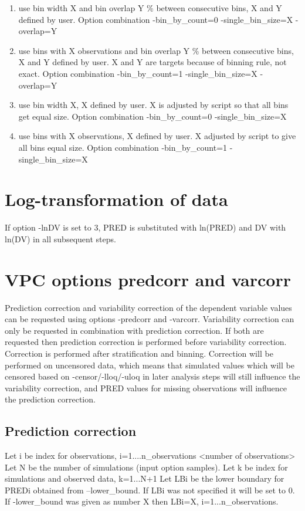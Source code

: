 \begin{enumerate}
	\item use bin width X and bin overlap Y \% between consecutive bins, X and Y defined by user. Option combination -bin\_by\_count=0 -single\_bin\_size=X -overlap=Y
	\item use bins with X observations and bin overlap Y \% between consecutive bins, X and Y defined by user.  X and Y are targets because of binning rule, not exact. Option combination -bin\_by\_count=1 -single\_bin\_size=X -overlap=Y
	\item use bin width X, X defined by user. X is adjusted by script so that all bins get equal size. Option combination -bin\_by\_count=0 -single\_bin\_size=X
	\item use bins with X observations, X defined by user.  X adjusted by script to give all bins equal size. Option combination -bin\_by\_count=1 -single\_bin\_size=X
\end{enumerate}

\section{Log-transformation of data}
If option -lnDV is set to 3,  PRED is substituted with ln(PRED) and DV with ln(DV) in all subsequent steps. 

\section{VPC options predcorr and varcorr }
Prediction correction and variability correction of the dependent variable values can be requested using options -predcorr and -varcorr. Variability correction can only be requested in combination with prediction correction. If both are requested then prediction correction is performed before variability correction. Correction is performed after stratification and binning. Correction will be performed on uncensored data, which means that simulated values which will be censored based on -censor/-lloq/-uloq in later analysis steps will still influence the variability correction, and PRED values for missing observations will influence the prediction correction.

\subsection{Prediction correction}
Let i be index for observations, i=1....n\_observations <number of observations>
Let N be the number of simulations (input option samples).
Let k be index for simulations and observed data, k=1...N+1
Let LBi be the lower boundary for PREDi obtained from –lower\_bound. If LBi was not specified it will be set to 0. If -lower\_bound was given as number X then LBi=X, i=1...n\_observations.

